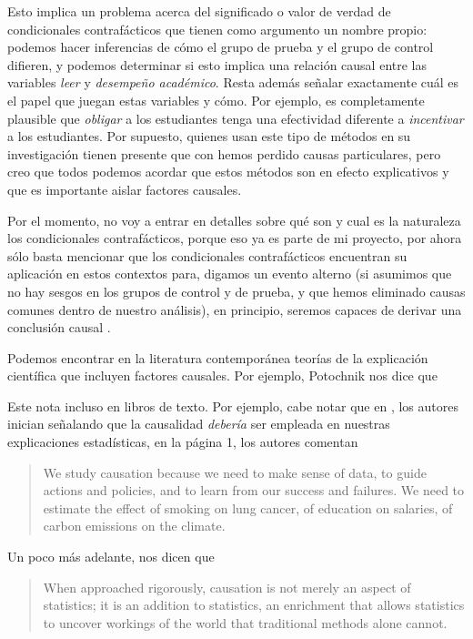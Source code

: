 Esto implica un problema acerca del significado o valor de verdad de
condicionales contrafácticos que tienen como argumento un nombre
propio: podemos hacer inferencias de cómo el grupo de prueba y el
grupo de control difieren, y podemos determinar si esto implica una
relación causal entre las variables \emph{leer} y \emph{desempeño
	académico}. Resta además señalar exactamente cuál es el papel que
juegan estas variables y cómo. Por ejemplo, es completamente
plausible que \emph{obligar} a los estudiantes tenga una efectividad
diferente a \emph{incentivar} a los estudiantes. Por supuesto,
quienes usan este tipo de métodos en su investigación tienen presente
que con hemos perdido causas particulares, pero creo que todos
podemos acordar que estos métodos son en efecto explicativos y que es
importante aislar factores causales.

Por el momento, no voy a entrar en detalles sobre qué son y cual es
la naturaleza los condicionales contrafácticos, porque eso ya es
parte de mi proyecto, por ahora sólo basta mencionar que los
condicionales contrafácticos encuentran su aplicación en estos
contextos para, digamos  un evento alterno (si asumimos
que no hay sesgos en los grupos de control y de prueba, y que hemos
eliminado causas comunes dentro de nuestro análisis), en principio,
seremos capaces de derivar una conclusión causal \cite{Pearl2016,
	Otsuka2023}.

Podemos encontrar en la literatura contemporánea teorías de la
explicación científica que incluyen factores causales. Por ejemplo,
Potochnik nos dice que 
\parencite[][p.~24] {Potochnik2017-POTIAT-3}

Este  nota incluso en libros de texto. Por
ejemplo, cabe notar que en \cite{Pearl2016}, los autores inician
señalando que la causalidad \emph{debería} ser empleada en nuestras
explicaciones estadísticas, en la página 1, los autores comentan

\begin{quote}
	We study causation because we need to make sense of data, to guide
	actions and policies, and to learn from our success and failures.
	We need to estimate the effect of smoking on lung cancer, of
	education on salaries, of carbon emissions on the climate.
\end{quote}

Un poco más adelante, nos dicen que

\begin{quote}
	When approached rigorously, causation is not merely an aspect of
	statistics; it is an addition to statistics, an enrichment that
	allows statistics to uncover workings of the world that traditional
	methods alone cannot.
\end{quote}

